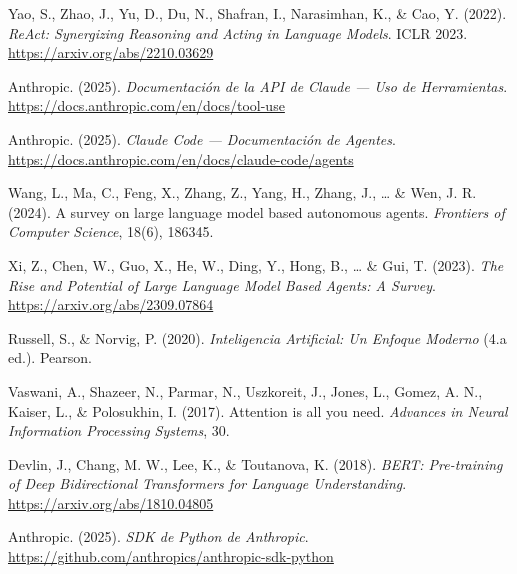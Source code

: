 \documentclass[11pt,letterpaper]{article}
\begin{document}
\begin{enumerate}[leftmargin=*, label={[\arabic*]}]
    \item Yao, S., Zhao, J., Yu, D., Du, N., Shafran, I., Narasimhan, K., \& Cao, Y. (2022). \textit{ReAct: Synergizing Reasoning and Acting in Language Models}. ICLR 2023. \url{https://arxiv.org/abs/2210.03629}

    \item Anthropic. (2025). \textit{Documentación de la API de Claude --- Uso de Herramientas}. \url{https://docs.anthropic.com/en/docs/tool-use}

    \item Anthropic. (2025). \textit{Claude Code --- Documentación de Agentes}. \url{https://docs.anthropic.com/en/docs/claude-code/agents}

    \item Wang, L., Ma, C., Feng, X., Zhang, Z., Yang, H., Zhang, J., \ldots{} \& Wen, J. R. (2024). A survey on large language model based autonomous agents. \textit{Frontiers of Computer Science}, 18(6), 186345.

    \item Xi, Z., Chen, W., Guo, X., He, W., Ding, Y., Hong, B., \ldots{} \& Gui, T. (2023). \textit{The Rise and Potential of Large Language Model Based Agents: A Survey}. \url{https://arxiv.org/abs/2309.07864}

    \item Russell, S., \& Norvig, P. (2020). \textit{Inteligencia Artificial: Un Enfoque Moderno} (4.a ed.). Pearson.

    \item Vaswani, A., Shazeer, N., Parmar, N., Uszkoreit, J., Jones, L., Gomez, A. N., Kaiser, L., \& Polosukhin, I. (2017). Attention is all you need. \textit{Advances in Neural Information Processing Systems}, 30.

    \item Devlin, J., Chang, M. W., Lee, K., \& Toutanova, K. (2018). \textit{BERT: Pre-training of Deep Bidirectional Transformers for Language Understanding}. \url{https://arxiv.org/abs/1810.04805}

    \item Anthropic. (2025). \textit{SDK de Python de Anthropic}. \url{https://github.com/anthropics/anthropic-sdk-python}
\end{enumerate}

\end{document}
